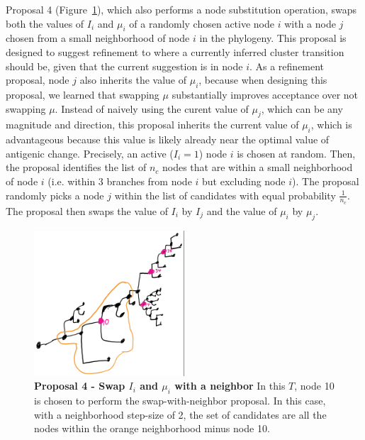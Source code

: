 \documentclass[11pt,oneside,letterpaper]{article}
\begin{document}
Proposal 4 (Figure~\ref{multistep}), which also performs a node substitution operation, swaps both the values of $I_i$ and $\mu_i$ of a randomly chosen active node $i$ with a node $j$ chosen from a small neighborhood of node $i$ in the phylogeny. 
This proposal is designed to suggest refinement to where a currently inferred cluster transition should be, given that the current suggestion is in node $i$.
As a refinement proposal, node $j$ also inherits the value of $\mu_i$, because when designing this proposal, we learned that swapping $\mu$ substantially improves acceptance over not swapping $\mu$.
Instead of naively using the curent value of $\mu_j$, which can be any magnitude and direction, this proposal inherits the current value of  $\mu_i$, which is advantageous because this value is likely already near the optimal value of antigenic change.
Precisely, an active ($I_i=1$) node $i$ is chosen at random.
Then, the proposal identifies the list of $n_{c}$ nodes that are within a small neighborhood of node $i$ (i.e.  within 3 branches from node $i$ but excluding node $i$).
The proposal randomly picks a node $j$ within the list of candidates with equal probability $\frac{1}{n_{c}}$.
The proposal then swaps the value of $I_i$ by $I_j$ and the value of $\mu_i$ by $\mu_j$.




\begin{figure}[h]
	\centering		
	\includegraphics[width=0.5\textwidth]{figures/multistep}
	\caption{\textbf{Proposal 4 - Swap $I_i$ and $\mu_i$ with a neighbor} 
In this $T$, node 10 is chosen to perform the swap-with-neighbor proposal. In this case, with a neighborhood step-size of 2, the set of candidates are all the nodes within the orange neighborhood minus node 10.
	} 
	\label{multistep} 
\end{figure}
\end{document}
